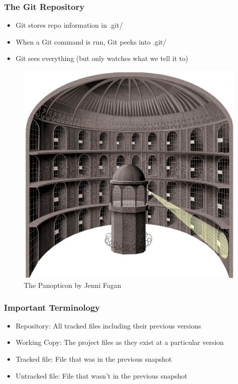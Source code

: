 \documentclass{beamer}
\begin{document}
\begin{frame}
	\frametitle{The Git Repository}
	\begin{itemize}
		\item{Git stores repo information in .git/}
		\item{When a Git command is run, Git peeks into .git/}
		\item{Git sees everything (but only watches what we tell it to)}
	\end{itemize}
	\begin{figure}
		\includegraphics[scale=0.5]{panopticon.jpg}
		\caption{The Panopticon by Jenni Fagan}
	\end{figure}
\end{frame}

\begin{frame}
	\frametitle{Important Terminology}
	\begin{itemize}
		\item{Repository: All tracked files including their previous versions}
		\item{Working Copy: The project files as they exist at a particular version}
		\item{Tracked file: File that was in the previous snapshot}
		\item{Untracked file: File that wasn't in the previous snapshot}
	\end{itemize}
\end{frame}
\end{document}
